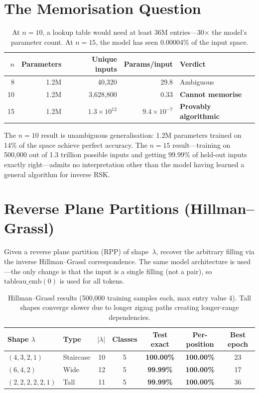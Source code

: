 \documentclass[11pt,a4paper]{article}
\begin{document}
\section{The Memorisation Question}

\begin{table}[h]
\centering
\begin{tabular}{rrrrl}
\toprule
$n$ & Parameters & Unique inputs & Params/input & Verdict \\
\midrule
8 & 1.2M & 40{,}320 & 29.8 & Ambiguous \\
10 & 1.2M & 3{,}628{,}800 & 0.33 & \textbf{Cannot memorise} \\
15 & 1.2M & $1.3 \times 10^{12}$ & $9.4 \times 10^{-7}$ & \textbf{Provably algorithmic} \\
\bottomrule
\end{tabular}
\caption{At $n{=}10$, a lookup table would need at least 36M entries---30$\times$ the model's parameter count. At $n{=}15$, the model has seen 0.00004\% of the input space.}
\end{table}

The $n{=}10$ result is unambiguous generalisation: 1.2M parameters trained on 14\% of the space achieve perfect accuracy. The $n{=}15$ result---training on 500{,}000 out of 1.3 trillion possible inputs and getting 99.99\% of held-out inputs exactly right---admits no interpretation other than the model having learned a general algorithm for inverse RSK.

\section{Reverse Plane Partitions (Hillman--Grassl)}

Given a reverse plane partition (RPP) of shape~$\lambda$, recover the arbitrary filling via the inverse Hillman--Grassl correspondence. The same model architecture is used---the only change is that the input is a single filling (not a pair), so $\mathrm{tableau\_emb}(0)$ is used for all tokens.

\begin{table}[h]
\centering
\begin{tabular}{llrcccc}
\toprule
Shape $\lambda$ & Type & $|\lambda|$ & Classes & Test exact & Per-position & Best epoch \\
\midrule
$(4,3,2,1)$ & Staircase & 10 & 5 & \textbf{100.00\%} & \textbf{100.00\%} & 23 \\
$(6,4,2)$ & Wide & 12 & 5 & \textbf{99.99\%} & \textbf{100.00\%} & 17 \\
$(2,2,2,2,2,1)$ & Tall & 11 & 5 & \textbf{99.99\%} & \textbf{100.00\%} & 36 \\
\bottomrule
\end{tabular}
\caption{Hillman--Grassl results (500{,}000 training samples each, max entry value 4). Tall shapes converge slower due to longer zigzag paths creating longer-range dependencies.}
\end{table}
\end{document}
